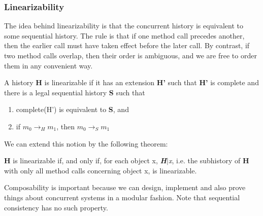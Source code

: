 \documentclass[main]{subfiles}
\begin{document}

\subsubsection{Linearizability}
The idea behind linearizability is that the concurrent history is equivalent to some sequential history. The rule is that if one method call precedes another, then the earlier call must have taken effect before the later call. By contrast, if two method calls overlap,  then their order is ambiguous, and we are free to order them in any convenient way.
\begin{definition}
    A history \textbf{H} is linearizable if it has an extension \textbf{H'} such that \textbf{H'} is complete and there is a legal sequential history \textbf{S} such that
    \begin{enumerate}
        \item complete(H') is equivalent to \textbf{S}, and
        \item if $m_0 \rightarrow_H m_1$, then $m_0 \rightarrow_S m_1$
    \end{enumerate}
\end{definition}
We can extend this notion by the following theorem:
\begin{theorem}
    \textbf{H} is linearizable if, and only if, for each object x, \textit{\textbf{H}$\mid$x}, i.e. the subhistory of \textbf{H} with only all method calls concerning object x, is linearizable.
\end{theorem}
Composability is important because we can design, implement and also prove things about concurrent systems in a modular fashion. Note that sequential consistency has no such property.
\newpage

\end{document}
